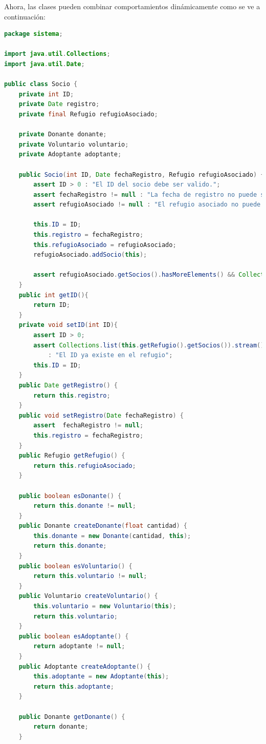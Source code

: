 Ahora, las clases pueden combinar comportamientos dinámicamente como se ve a continuación:
\begin{lstlisting}[style = javaNormal, language=Java] 
package sistema;

import java.util.Collections;
import java.util.Date;

public class Socio {
    private int ID;
    private Date registro;
    private final Refugio refugioAsociado;

    private Donante donante;
    private Voluntario voluntario;
    private Adoptante adoptante;

    public Socio(int ID, Date fechaRegistro, Refugio refugioAsociado) {
        assert ID > 0 : "El ID del socio debe ser valido.";
        assert fechaRegistro != null : "La fecha de registro no puede ser nula.";
        assert refugioAsociado != null : "El refugio asociado no puede ser nulo.";

        this.ID = ID;
        this.registro = fechaRegistro;
        this.refugioAsociado = refugioAsociado;
        refugioAsociado.addSocio(this);

        assert refugioAsociado.getSocios().hasMoreElements() && Collections.list(refugioAsociado.getSocios()).contains(this);
    }
    public int getID(){
        return ID;
    }
    private void setID(int ID){
        assert ID > 0;
        assert Collections.list(this.getRefugio().getSocios()).stream().noneMatch(s -> s.getID() == ID)
            : "El ID ya existe en el refugio";
        this.ID = ID;
    }
    public Date getRegistro() {
        return this.registro;
    }
    public void setRegistro(Date fechaRegistro) {
        assert  fechaRegistro != null;
        this.registro = fechaRegistro;
    }
    public Refugio getRefugio() {
        return this.refugioAsociado;
    }

    public boolean esDonante() {
        return this.donante != null;
    }
    public Donante createDonante(float cantidad) {
        this.donante = new Donante(cantidad, this);
        return this.donante;
    }
    public boolean esVoluntario() {
        return this.voluntario != null;
    }
    public Voluntario createVoluntario() {
        this.voluntario = new Voluntario(this);
        return this.voluntario;
    }
    public boolean esAdoptante() {
        return adoptante != null;
    }
    public Adoptante createAdoptante() {
        this.adoptante = new Adoptante(this);
        return this.adoptante;
    }

    public Donante getDonante() {
        return donante;
    }


\end{lstlisting}
